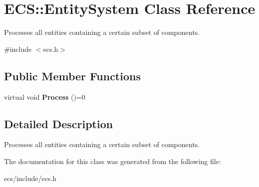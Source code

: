 \hypertarget{class_e_c_s_1_1_entity_system}{\section{E\-C\-S\-:\-:Entity\-System Class Reference}
\label{class_e_c_s_1_1_entity_system}
}


Processes all entities containing a certain subset of components.  




{\ttfamily \#include $<$ecs.\-h$>$}

\subsection*{Public Member Functions}
\begin{DoxyCompactItemize}
\item 
\hypertarget{class_e_c_s_1_1_entity_system_a87a27ddea7fcd58d6c239ca446d2e1d0}{virtual void {\bfseries Process} ()=0}\label{class_e_c_s_1_1_entity_system_a87a27ddea7fcd58d6c239ca446d2e1d0}

\end{DoxyCompactItemize}


\subsection{Detailed Description}
Processes all entities containing a certain subset of components. 

The documentation for this class was generated from the following file\-:\begin{DoxyCompactItemize}
\item 
ecs/include/ecs.\-h\end{DoxyCompactItemize}
